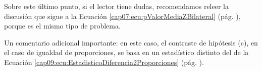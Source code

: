 Sobre este último punto, si el lector tiene dudas, recomendamos releer la discusión que sigue a la Ecuación \ref{cap07:ecu:pValorMediaZBilateral} (pág. \pageref{cap07:ecu:pValorMediaZBilateral}), porque es el mismo tipo de problema.

Un comentario adicional importante: en este caso, el contraste de hipótesis (c), en el caso de
igualdad de proporciones, se basa en un estadístico distinto del de la Ecuación
\ref{cap09:ecu:EstadisticoDiferencia2Proporciones} (pág.
\pageref{cap09:ecu:EstadisticoDiferencia2Proporciones}).


